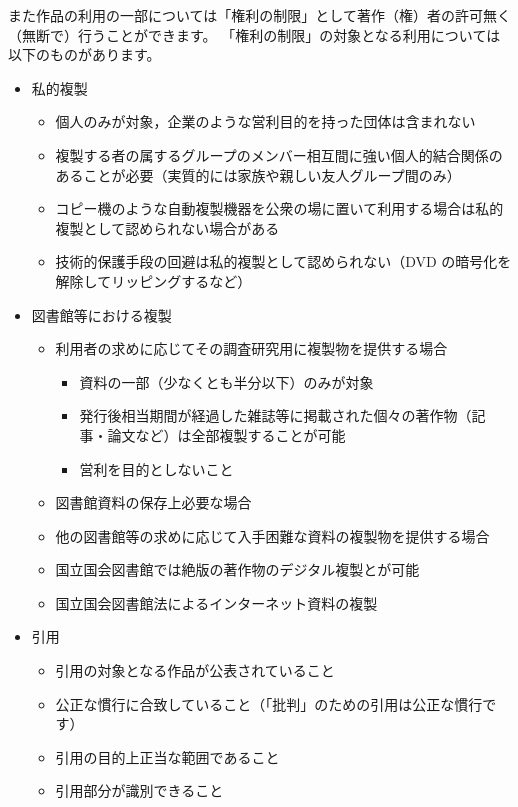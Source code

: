 \documentclass{ltjsarticle}
\renewcommand{\emph}[1]{\textsf{\textgt{#1}}} %
\begin{document}
また作品の利用の一部については「権利の制限」として著作（権）者の許可無く（無断で）行うことができます。
「権利の制限」の対象となる利用については以下のものがあります。
\begin{itemize}
\item 私的複製
      \begin{itemize}
      \item 個人のみが対象，企業のような営利目的を持った団体は含まれない
      \item 複製する者の属するグループのメンバー相互間に強い個人的結合関係のあることが必要（実質的には家族や親しい友人グループ間のみ）
      \item コピー機のような自動複製機器を公衆の場に置いて利用する場合は私的複製として認められない場合がある
      \item 技術的保護手段の回避は私的複製として認められない（DVD の暗号化を解除してリッピングするなど）
      \end{itemize}
\item 図書館等における複製
      \begin{itemize}
      \item 利用者の求めに応じてその調査研究用に複製物を提供する場合
            \begin{itemize}
            \item 資料の一部（少なくとも半分以下）のみが対象
            \item 発行後相当期間が経過した雑誌等に掲載された個々の著作物（記事・論文など）は全部複製することが可能
            \item 営利を目的としないこと
            \end{itemize}
      \item 図書館資料の保存上必要な場合
      \item 他の図書館等の求めに応じて入手困難な資料の複製物を提供する場合
      \item 国立国会図書館では絶版の著作物のデジタル複製と\emph{自動公衆送信}が可能
      \item 国立国会図書館法によるインターネット資料の複製
      \end{itemize}
\item 引用
      \begin{itemize}
      \item 引用の対象となる作品が公表されていること
      \item 公正な慣行に合致していること（「批判」のための引用は公正な慣行です）
      \item 引用の目的上正当な範囲であること
      \item 引用部分が識別できること

\end{itemize}
\end{itemize}
\end{document}
